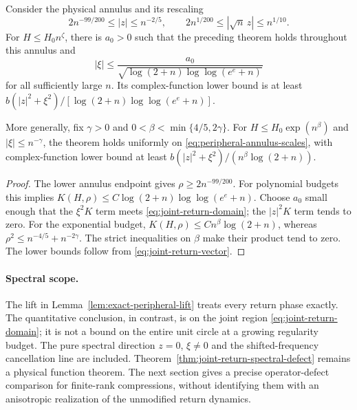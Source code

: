 \begin{corollary}
\label{cor:peripheral-annulus-budgets}
Consider the physical annulus and its rescaling
\begin{equation}\label{eq:peripheral-annulus-scales}
 2n^{-99/200}\le|z|\le n^{-2/5},\qquad
 2n^{1/200}\le|\sqrt n\,z|\le n^{1/10}.
\end{equation}
For $H\le H_0n^\zeta$, there is $a_0>0$ such that the preceding
theorem holds throughout this annulus and
\[
 |\xi|\le\frac{a_0}{\sqrt{\log(2+n)\log\log(e^e+n)}}
\]
for all sufficiently large $n$. Its complex-function lower bound is
at least $b(|z|^2+\xi^2)/[\log(2+n)\log\log(e^e+n)]$.

More generally, fix $\gamma>0$ and
$0<\beta<\min\{4/5,2\gamma\}$. For
$H\le H_0\exp(n^\beta)$ and $|\xi|\le n^{-\gamma}$, the theorem
holds uniformly on \eqref{eq:peripheral-annulus-scales}, with
complex-function lower bound at least
$b(|z|^2+\xi^2)/(n^\beta\log(2+n))$.
\end{corollary}
\begin{proof}
The lower annulus endpoint gives $\rho\ge2n^{-99/200}$.
For polynomial budgets this implies
$K(H,\rho)\le C\log(2+n)\log\log(e^e+n)$.
Choose $a_0$ small enough that the $\xi^2K$ term meets
\eqref{eq:joint-return-domain}; the $|z|^2K$ term tends to zero.
For the exponential budget, $K(H,\rho)\le Cn^\beta\log(2+n)$,
whereas $\rho^2\le n^{-4/5}+n^{-2\gamma}$.
The strict inequalities on $\beta$ make their product tend to zero.
The lower bounds follow from \eqref{eq:joint-return-vector}.
\end{proof}

\paragraph{Spectral scope.}
The lift in Lemma~\ref{lem:exact-peripheral-lift} treats every return
phase exactly. The quantitative conclusion, in contrast, is on the
joint region \eqref{eq:joint-return-domain}; it is not a bound on the
entire unit circle at a growing regularity budget. The pure spectral
direction $z=0$, $\xi\ne0$ and the shifted-frequency cancellation line
are included. Theorem~\ref{thm:joint-return-spectral-defect} remains a
physical function theorem. The next section gives a precise
operator-defect comparison for finite-rank compressions, without
identifying them with an anisotropic realization of the unmodified
return dynamics.
